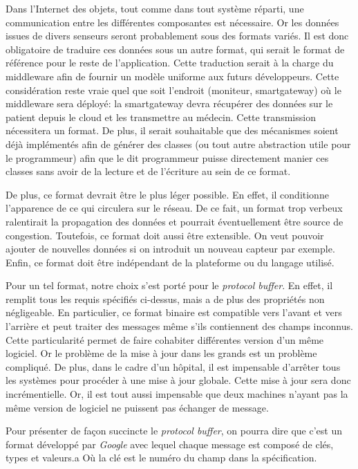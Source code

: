 Dans l'Internet des objets, tout comme dans tout système réparti, une communication entre les différentes composantes est
nécessaire. Or les données issues de divers senseurs seront probablement sous des formats variés. Il est donc obligatoire de
traduire ces données sous un autre format, qui serait le format de référence pour le reste de l'application. Cette traduction
serait à la charge du middleware afin de fournir un modèle uniforme aux futurs développeurs. Cette considération reste vraie
quel que soit l'endroit (moniteur, smartgateway) où le middleware sera déployé: la smartgateway devra récupérer des données sur le
patient depuis le cloud et les transmettre au médecin. Cette transmission nécessitera un format. De plus, il serait souhaitable
que des mécanismes soient déjà implémentés afin de générer des classes (ou tout autre abstraction utile pour le programmeur) afin
que le dit programmeur puisse directement manier ces classes sans avoir de la lecture et de l'écriture au sein de ce format.
\newline

De plus, ce format devrait être le plus léger possible. En effet, il conditionne l'apparence de ce qui circulera sur le
réseau. De ce fait, un format trop verbeux ralentirait la propagation des données et pourrait éventuellement être source de
congestion. Toutefois, ce format doit aussi être extensible. On veut pouvoir ajouter de nouvelles données si on introduit un
nouveau capteur par exemple. Enfin, ce format doit être indépendant de la plateforme ou du langage utilisé.  
\newline

Pour un tel format, notre choix s'est porté pour le \textit{protocol buffer}. En effet, il remplit tous les requis spécifiés
ci-dessus, mais a de plus des propriétés non négligeable. En particulier, ce format binaire est compatible vers l'avant et vers
l'arrière et peut traiter des messages même s'ils contiennent des champs inconnus. Cette particularité permet de faire cohabiter
différentes version d'un même logiciel. Or le problème de la mise à jour dans les grands est un problème compliqué. De plus, dans
le cadre d'un hôpital, il est impensable d'arrêter tous les systèmes pour procéder à une mise à jour globale. Cette mise à jour
sera donc incrémentielle. Or, il est tout aussi impensable que deux machines n'ayant pas la même version de logiciel ne puissent
pas échanger de message. 
\newline

Pour présenter de façon succincte le \textit{protocol buffer}, on pourra dire que c'est un format développé par \textit{Google}
avec lequel chaque message est composé de clés, types et valeurs.a Où la clé est le numéro du champ dans la spécification.

